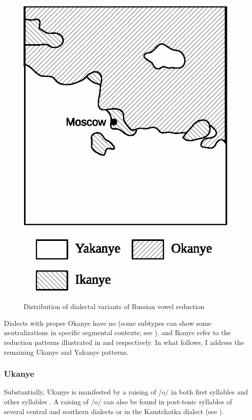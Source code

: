 \documentclass[output=paper,modfonts,newtxmath,hidelinks,]{langscibook}
\begin{document}
\begin{figure}
{\includegraphics[height=0.3\textheight]{figures/05enguehard_f2.eps}
}
\caption{Distribution of dialectal variants of Russian vowel reduction}\label{5:f1}
\end{figure}

Dialects with proper Okanye have no  (some subtypes can show some neutralizations in specific segmental contexts; see \citealt[§46, §56]{Avanesov1949}).  and Ikanye refer to the reduction patterns illustrated in  and  respectively. In what follows, I address the remaining Ukanye and Yakanye patterns.

\subsubsection{Ukanye}\label{5:s2.3.1}

Substantially, Ukanye is manifested by a raising of /o/ in both first  syllables  and other  syllables . A raising of /o/ can also be found in post-tonic syllables of several central and southern dialects \citep[§104]{Avanesov1949} or in the Kamtchatka dialect (see \citealt[40]{Gluschenko2007}).
\end{document}
